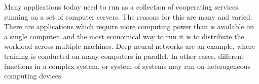 \documentclass[11pt,a4paper,titlepage]{article}
\newcommand\needc{{\color{purple}\textit{(citation needed)}}}
\theoremstyle{definition}
\begin{document}
%
%
%
%

Many applications today need to run as a collection of cooperating services
running on a set of computer servers.
The reasons for this are many and varied.
There are applications which require more computing power than is available on
a single computer,
and the most economical way to run it is to distribute the workload across
multiple machines.
Deep neural networks are an example,
where training is conducted on many computers in parallel.
In other cases,
different functions in a complex system, or system of systems may run on
heterogeneous computing devices.
\end{document}
